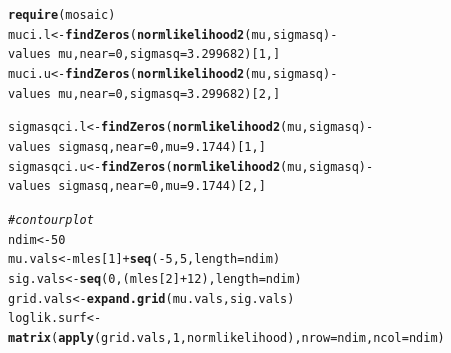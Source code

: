 \documentclass[12pt]{article}\usepackage[]{graphicx}\usepackage[]{color}
\makeatletter
\newcommand{\hlnum}[1]{\textcolor[rgb]{0.686,0.059,0.569}{#1}}%
\newcommand{\hlcom}[1]{\textcolor[rgb]{0.678,0.584,0.686}{\textit{#1}}}%
\newcommand{\hlopt}[1]{\textcolor[rgb]{0,0,0}{#1}}%
\newcommand{\hlstd}[1]{\textcolor[rgb]{0.345,0.345,0.345}{#1}}%
\newcommand{\hlkwb}[1]{\textcolor[rgb]{0.69,0.353,0.396}{#1}}%
\newcommand{\hlkwc}[1]{\textcolor[rgb]{0.333,0.667,0.333}{#1}}%
\newcommand{\hlkwd}[1]{\textcolor[rgb]{0.737,0.353,0.396}{\textbf{#1}}}%
\newenvironment{kframe}{%
 \def\at@end@of@kframe{}%
 \ifinner\ifhmode%
  \def\at@end@of@kframe{\end{minipage}}%
  \begin{minipage}{\columnwidth}%
 \fi\fi%
 \def\FrameCommand##1{\hskip\@totalleftmargin \hskip-\fboxsep
 \colorbox{shadecolor}{##1}\hskip-\fboxsep
     \hskip-\linewidth \hskip-\@totalleftmargin \hskip\columnwidth}%
 \MakeFramed {\advance\hsize-\width
   \@totalleftmargin\z@ \linewidth\hsize
   \@setminipage}}%
 {\par\unskip\endMakeFramed%
 \at@end@of@kframe}
\newenvironment{knitrout}{}{} %
\makeatother
\begin{document}
\begin{knitrout}
\begin{kframe}
\begin{alltt}
\hlkwd{require}\hlstd{(mosaic)}
\hlstd{muci.l} \hlkwb{<-} \hlkwd{findZeros}\hlstd{(}\hlkwd{normlikelihood2}\hlstd{(mu, sigmasq)}\hlopt{-}\hlstd{values} \hlopt{~} \hlstd{mu,} \hlkwc{near}\hlstd{=}\hlnum{0}\hlstd{,} \hlkwc{sigmasq}\hlstd{=}\hlnum{3.299682}\hlstd{)[}\hlnum{1}\hlstd{,]}
\hlstd{muci.u} \hlkwb{<-} \hlkwd{findZeros}\hlstd{(}\hlkwd{normlikelihood2}\hlstd{(mu, sigmasq)}\hlopt{-}\hlstd{values} \hlopt{~} \hlstd{mu,} \hlkwc{near}\hlstd{=}\hlnum{0}\hlstd{,} \hlkwc{sigmasq}\hlstd{=}\hlnum{3.299682}\hlstd{)[}\hlnum{2}\hlstd{,]}

\hlstd{sigmasqci.l} \hlkwb{<-} \hlkwd{findZeros}\hlstd{(}\hlkwd{normlikelihood2}\hlstd{(mu, sigmasq)}\hlopt{-}\hlstd{values} \hlopt{~} \hlstd{sigmasq,} \hlkwc{near}\hlstd{=}\hlnum{0}\hlstd{,} \hlkwc{mu}\hlstd{=}\hlnum{9.1744}\hlstd{)[}\hlnum{1}\hlstd{,]}
\hlstd{sigmasqci.u} \hlkwb{<-} \hlkwd{findZeros}\hlstd{(}\hlkwd{normlikelihood2}\hlstd{(mu, sigmasq)}\hlopt{-}\hlstd{values} \hlopt{~} \hlstd{sigmasq,} \hlkwc{near}\hlstd{=}\hlnum{0}\hlstd{,} \hlkwc{mu}\hlstd{=}\hlnum{9.1744}\hlstd{)[}\hlnum{2}\hlstd{,]}


\hlcom{#contour plot}
\hlstd{ndim} \hlkwb{<-} \hlnum{50}
\hlstd{mu.vals} \hlkwb{<-} \hlstd{mles[}\hlnum{1}\hlstd{]} \hlopt{+} \hlkwd{seq}\hlstd{(}\hlopt{-}\hlnum{5}\hlstd{,}\hlnum{5}\hlstd{,} \hlkwc{length}\hlstd{=ndim)}
\hlstd{sig.vals} \hlkwb{<-} \hlkwd{seq}\hlstd{(}\hlnum{0}\hlstd{, (mles[}\hlnum{2}\hlstd{]} \hlopt{+} \hlnum{12}\hlstd{),} \hlkwc{length}\hlstd{=ndim)}
\hlstd{grid.vals} \hlkwb{<-} \hlkwd{expand.grid}\hlstd{(mu.vals,sig.vals)}
\hlstd{loglik.surf} \hlkwb{<-} \hlkwd{matrix}\hlstd{(}\hlkwd{apply}\hlstd{(grid.vals,}\hlnum{1}\hlstd{,normlikelihood),} \hlkwc{nrow}\hlstd{=ndim,} \hlkwc{ncol}\hlstd{=ndim)}


\end{alltt}
\end{kframe}
\end{knitrout}
\end{document}
